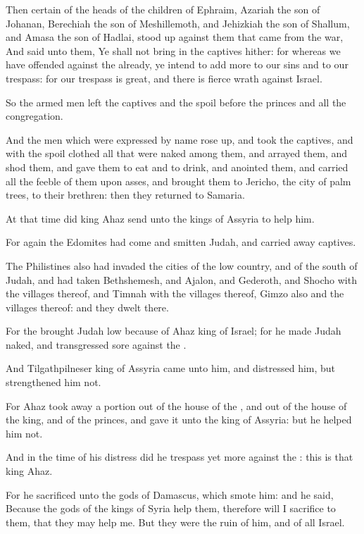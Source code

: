 \Verse Then certain of the heads of the children of Ephraim, Azariah the son of Johanan, Berechiah the son of Meshillemoth, and Jehizkiah the son of Shallum, and Amasa the son of Hadlai, stood up against them that came from the war, \Verse And said unto them, Ye shall not bring in the captives hither: for whereas we have offended against the \LORD already, ye intend to add more to our sins and to our trespass: for our trespass is great, and there is fierce wrath against Israel.

\Verse So the armed men left the captives and the spoil before the princes and all the congregation.

\Verse And the men which were expressed by name rose up, and took the captives, and with the spoil clothed all that were naked among them, and arrayed them, and shod them, and gave them to eat and to drink, and anointed them, and carried all the feeble of them upon asses, and brought them to Jericho, the city of palm trees, to their brethren: then they returned to Samaria.

\Verse At that time did king Ahaz send unto the kings of Assyria to help him.

\Verse For again the Edomites had come and smitten Judah, and carried away captives.

\Verse The Philistines also had invaded the cities of the low country, and of the south of Judah, and had taken Bethshemesh, and Ajalon, and Gederoth, and Shocho with the villages thereof, and Timnah with the villages thereof, Gimzo also and the villages thereof: and they dwelt there.

\Verse For the \LORD brought Judah low because of Ahaz king of Israel; for he made Judah naked, and transgressed sore against the \LORD.

\Verse And Tilgathpilneser king of Assyria came unto him, and distressed him, but strengthened him not.

\Verse For Ahaz took away a portion out of the house of the \LORD, and out of the house of the king, and of the princes, and gave it unto the king of Assyria: but he helped him not.

\Verse And in the time of his distress did he trespass yet more against the \LORD: this is that king Ahaz.

\Verse For he sacrificed unto the gods of Damascus, which smote him: and he said, Because the gods of the kings of Syria help them, therefore will I sacrifice to them, that they may help me. But they were the ruin of him, and of all Israel.

